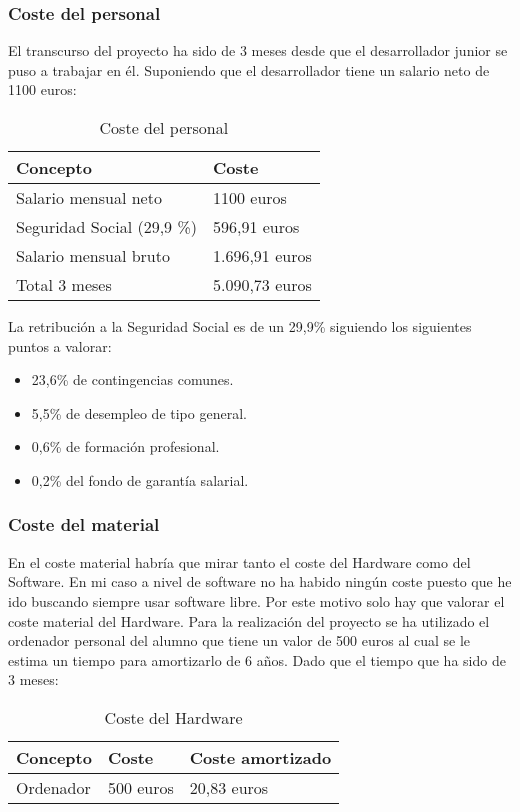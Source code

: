 \subsubsection{Coste del personal}
El transcurso del proyecto ha sido de 3 meses desde que el desarrollador junior se puso a trabajar en él. Suponiendo que el desarrollador tiene un salario neto de 1100 euros:

\begin{table}[!h]
	\centering
	\begin{tabular}{@{}l|l@{}}
		\toprule
		Concepto & Coste  \\
		\midrule
		Salario mensual neto & 1100 euros \\
		Seguridad Social (29,9 \%) & 596,91 euros \\
		Salario mensual bruto & 1.696,91 euros \\
		\midrule
		Total 3 meses & 5.090,73 euros \\
		\bottomrule
	\end{tabular}
	\caption{Coste del personal}
	\label{tab:personal}
\end{table}

La retribución a la Seguridad Social es de un 29,9\% siguiendo los siguientes puntos a valorar:


\begin{itemize}
	\item 23,6\% de contingencias comunes.
	\item 5,5\% de desempleo de tipo general.
	\item 0,6\% de formación profesional.
	\item 0,2\% del fondo de garantía salarial.
\end{itemize}

\subsubsection{Coste del material}
En el coste material habría que mirar tanto el coste del Hardware como del Software. En mi caso a nivel de software no ha habido ningún coste puesto que he ido buscando siempre usar software libre. 
Por este motivo solo hay que valorar el coste material del Hardware.
Para la realización del proyecto se ha utilizado el ordenador personal del alumno que tiene un valor de 500 euros al cual se le estima un tiempo para amortizarlo de 6 años. Dado que el tiempo que ha sido de 3 meses:


\begin{table}[!h]
	\centering
	\begin{tabular}{l|l|l}
		\toprule
		Concepto & Coste & Coste amortizado  \\
		\midrule
		Ordenador & 500 euros & 20,83 euros \\
		\bottomrule
	\end{tabular}
	\caption{Coste del Hardware}
	\label{tab:material}
\end{table}

